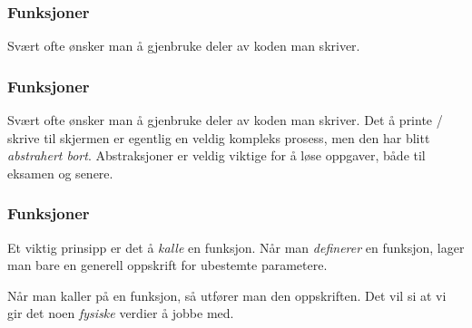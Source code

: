 
\begin{frame}
    \frametitle{Funksjoner}

    Svært ofte ønsker man å gjenbruke deler av koden man skriver. 

\end{frame}


\begin{frame}
    \frametitle{Funksjoner}

    Svært ofte ønsker man å gjenbruke deler av koden man skriver. Det å printe / skrive til skjermen er egentlig en veldig kompleks prosess, men den har blitt \textit{abstrahert bort}. Abstraksjoner er veldig viktige for å løse oppgaver, både til eksamen og senere. 

\end{frame}

\begin{frame}
    \frametitle{Funksjoner}

    Et viktig prinsipp er det å \textit{kalle} en funksjon. Når man \textit{definerer} en funksjon, lager man bare en generell oppskrift for ubestemte parametere. 
    
    Når man kaller på en funksjon, så utfører man den oppskriften. Det vil si at vi gir det noen \textit{fysiske} verdier å jobbe med. 

\end{frame}

